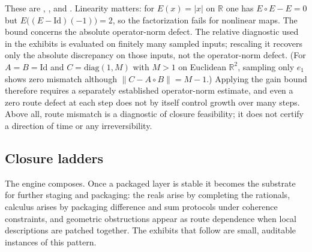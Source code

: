 \noindent These are , , and .
Linearity matters: for $E(x)=|x|$ on $\mathbb R$ one has $E\circ E-E=0$ but $E\bigl((E-\mathrm{Id})(-1)\bigr)=2$, so the factorization fails for nonlinear maps.
The bound concerns the absolute operator-norm defect.
The relative diagnostic used in the exhibits is evaluated on finitely many sampled inputs; rescaling it recovers only the absolute discrepancy on those inputs, not the operator-norm defect. (For $A=B=\mathrm{Id}$ and $C=\mathrm{diag}(1,M)$ with $M>1$ on Euclidean $\mathbb R^2$, sampling only $e_1$ shows zero mismatch although $\|C-A\circ B\|=M-1$.) Applying the gain bound therefore requires a separately established operator-norm estimate, and even a zero route defect at each step does not by itself control growth over many steps.
Above all, route mismatch is a diagnostic of closure feasibility; it does not certify a direction of time or any irreversibility.

\subsection{Closure ladders}
The engine composes.
Once a packaged layer is stable it becomes the substrate for further staging and packaging: the reals arise by completing the rationals, calculus arises by packaging difference and sum protocols under coherence constraints, and geometric obstructions appear as route dependence when local descriptions are patched together.
The exhibits that follow are small, auditable instances of this pattern.
